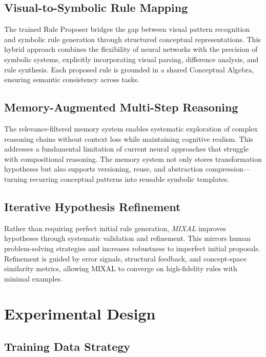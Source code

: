 \documentclass[12pt]{article}
\newcommand{\MIXAL}{\textit{MIXAL}}
\begin{document}
\subsection{Visual-to-Symbolic Rule Mapping}

The trained Rule Proposer bridges the gap between visual pattern recognition and symbolic rule generation through structured conceptual representations. This hybrid approach combines the flexibility of neural networks with the precision of symbolic systems, explicitly incorporating visual parsing, difference analysis, and rule synthesis. Each proposed rule is grounded in a shared Conceptual Algebra, ensuring semantic consistency across tasks.

\subsection{Memory-Augmented Multi-Step Reasoning}

The relevance-filtered memory system enables systematic exploration of complex reasoning chains without context loss while maintaining cognitive realism. This addresses a fundamental limitation of current neural approaches that struggle with compositional reasoning. The memory system not only stores transformation hypotheses but also supports versioning, reuse, and abstraction compression—turning recurring conceptual patterns into reusable symbolic templates.

\subsection{Iterative Hypothesis Refinement}

Rather than requiring perfect initial rule generation, \MIXAL{} improves hypotheses through systematic validation and refinement. This mirrors human problem-solving strategies and increases robustness to imperfect initial proposals. Refinement is guided by error signals, structural feedback, and concept-space similarity metrics, allowing MIXAL to converge on high-fidelity rules with minimal examples.

\section{Experimental Design}

\subsection{Training Data Strategy}
\end{document}
